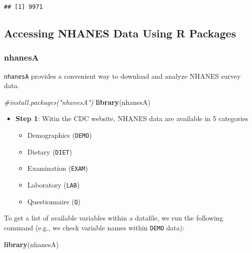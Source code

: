 \documentclass[
]{book}
\newenvironment{Shaded}{\begin{snugshade}}{\end{snugshade}}
\newcommand{\CommentTok}[1]{\textcolor[rgb]{0.56,0.35,0.01}{\textit{#1}}}
\newcommand{\KeywordTok}[1]{\textcolor[rgb]{0.13,0.29,0.53}{\textbf{#1}}}
\newcommand{\NormalTok}[1]{#1}
\providecommand{\tightlist}{%
  \setlength{\itemsep}{0pt}\setlength{\parskip}{0pt}}
\begin{document}
\begin{verbatim}
## [1] 9971
\end{verbatim}

\hypertarget{accessing-nhanes-data-using-r-packages}{%
\subsection{Accessing NHANES Data Using R Packages}\label{accessing-nhanes-data-using-r-packages}}

\hypertarget{nhanesa}{%
\subsubsection{nhanesA}\label{nhanesa}}

\texttt{nhanesA} provides a convenient way to download and analyze NHANES survey data.

\begin{Shaded}
\begin{Highlighting}[]
\CommentTok{#install.packages("nhanesA")}
\KeywordTok{library}\NormalTok{(nhanesA)}
\end{Highlighting}
\end{Shaded}

\begin{itemize}
\tightlist
\item
  \textbf{Step 1}: Witin the CDC website, NHANES data are available in 5 categories

  \begin{itemize}
  \tightlist
  \item
    Demographics (\texttt{DEMO})
  \item
    Dietary (\texttt{DIET})
  \item
    Examination (\texttt{EXAM})
  \item
    Laboratory (\texttt{LAB})
  \item
    Questionnaire (\texttt{Q})
  \end{itemize}
\end{itemize}

To get a list of available variables within a datafile, we run the following command (e.g., we check variable names within \texttt{DEMO} data):

\begin{Shaded}
\begin{Highlighting}[]
\KeywordTok{library}\NormalTok{(nhanesA)}
\end{Highlighting}
\end{Shaded}
\end{document}
